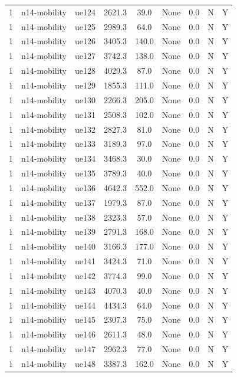 \begin{table}[ht]
\begin{tabular}{|c|c|c|c|c|c|c|c|c|}
1 & n14-mobility & ue124 & 2621.3 & 39.0 & None & 0.0 & N & Y \\
1 & n14-mobility & ue125 & 2989.3 & 64.0 & None & 0.0 & N & Y \\
1 & n14-mobility & ue126 & 3405.3 & 140.0 & None & 0.0 & N & Y \\
1 & n14-mobility & ue127 & 3742.3 & 138.0 & None & 0.0 & N & Y \\
1 & n14-mobility & ue128 & 4029.3 & 87.0 & None & 0.0 & N & Y \\
1 & n14-mobility & ue129 & 1855.3 & 111.0 & None & 0.0 & N & Y \\
1 & n14-mobility & ue130 & 2266.3 & 205.0 & None & 0.0 & N & Y \\
1 & n14-mobility & ue131 & 2508.3 & 102.0 & None & 0.0 & N & Y \\
1 & n14-mobility & ue132 & 2827.3 & 81.0 & None & 0.0 & N & Y \\
1 & n14-mobility & ue133 & 3189.3 & 97.0 & None & 0.0 & N & Y \\
1 & n14-mobility & ue134 & 3468.3 & 30.0 & None & 0.0 & N & Y \\
1 & n14-mobility & ue135 & 3789.3 & 40.0 & None & 0.0 & N & Y \\
1 & n14-mobility & ue136 & 4642.3 & 552.0 & None & 0.0 & N & Y \\
1 & n14-mobility & ue137 & 1979.3 & 87.0 & None & 0.0 & N & Y \\
1 & n14-mobility & ue138 & 2323.3 & 57.0 & None & 0.0 & N & Y \\
1 & n14-mobility & ue139 & 2791.3 & 168.0 & None & 0.0 & N & Y \\
1 & n14-mobility & ue140 & 3166.3 & 177.0 & None & 0.0 & N & Y \\
1 & n14-mobility & ue141 & 3424.3 & 71.0 & None & 0.0 & N & Y \\
1 & n14-mobility & ue142 & 3774.3 & 99.0 & None & 0.0 & N & Y \\
1 & n14-mobility & ue143 & 4070.3 & 40.0 & None & 0.0 & N & Y \\
1 & n14-mobility & ue144 & 4434.3 & 64.0 & None & 0.0 & N & Y \\
1 & n14-mobility & ue145 & 2307.3 & 75.0 & None & 0.0 & N & Y \\
1 & n14-mobility & ue146 & 2611.3 & 48.0 & None & 0.0 & N & Y \\
1 & n14-mobility & ue147 & 2962.3 & 77.0 & None & 0.0 & N & Y \\
1 & n14-mobility & ue148 & 3387.3 & 162.0 & None & 0.0 & N & Y \\

\end{tabular}
\end{table}
